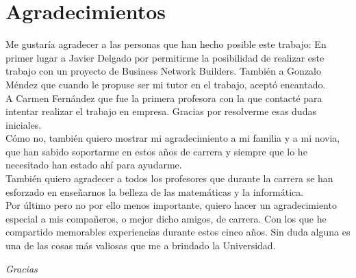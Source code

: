 \chapter*{Agradecimientos}
	Me gustaría agradecer a las personas que han hecho posible este trabajo:
	En primer lugar a Javier Delgado por permitirme la posibilidad de realizar este trabajo con un proyecto de Business Network Builders.
	También a Gonzalo Méndez que cuando le propuse ser mi tutor en el trabajo, aceptó encantado.\\

	A Carmen Fernández que fue la primera profesora con la que contacté para intentar realizar el trabajo en empresa.
	Gracias por resolverme esas dudas iniciales.\\
	
	Cómo no, también quiero mostrar mi agradecimiento a mi familia y a mi novia, 
	que han sabido soportarme en estos años de carrera y siempre que lo he necesitado han estado ahí para ayudarme.\\
	
	También quiero agradecer a todos los profesores que durante la carrera se han esforzado en enseñarnos la belleza de las matemáticas y la informática.\\
	
	Por último pero no por ello menos importante, quiero hacer un agradecimiento especial a mis compañeros, o mejor dicho amigos, de carrera.
	Con los que he compartido memorables experiencias durante estos cinco años. Sin duda alguna es una de las cosas más valiosas que me a brindado la Universidad.\\
	
	
	\begin{center}
		\textit{Gracias}
	\end{center}
	
	
	
	

		
